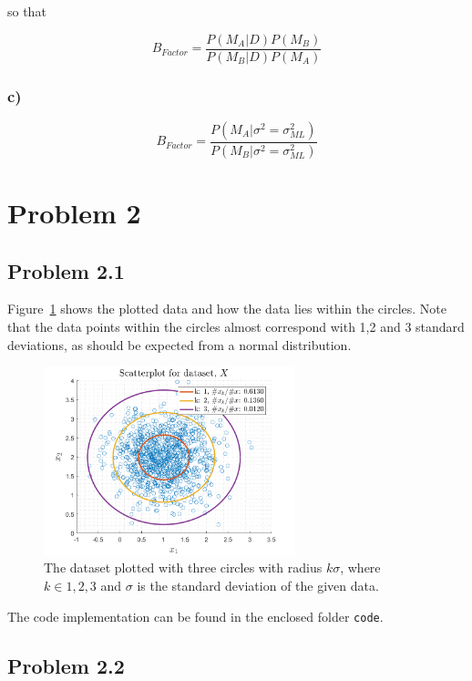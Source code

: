 \documentclass{article}
\begin{document}
so that

\begin{equation}
B_{Factor} = \frac{P(M_A|D)P(M_B) }{P(M_B|D)P(M_A)}
\end{equation}



\subsubsection*{c)}

\begin{equation}
B_{Factor}=\frac{P(M_A|\sigma^2=\sigma_{ML}^2)}{P(M_B|\sigma^2=\sigma_{ML}^2)}
\end{equation}

\newpage 

\section*{Problem 2}
\subsection*{Problem 2.1}
Figure~\ref{fig:prob21} shows the plotted data and how the data lies within the circles. Note that the data points within the circles almost correspond with 1,2 and 3 standard deviations, as should be expected from a normal distribution. 
\begin{figure}[H]
	\centering
	\includegraphics[width=0.65\textwidth]{Figures/plot2_1_scatter.png}	\caption{\label{fig:prob21}The dataset plotted with three circles with radius $k\sigma$, where $k\in {1,2,3}$ and $\sigma$ is the standard deviation of the given data.}
\end{figure}
The code implementation can be found in the enclosed folder \verb|code|.

\subsection*{Problem 2.2}
\end{document}
